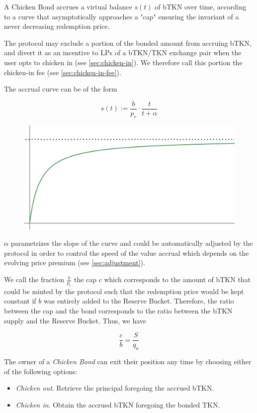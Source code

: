 \documentclass{article}
\begin{document}
A Chicken Bond accrues a virtual balance $s(t)$ of bTKN over time, according to a curve that asymptotically approaches a "cap" ensuring the invariant of a never decreasing redemption price. 

The protocol may exclude a portion of the bonded amount from accruing bTKN, and divert it as an incentive to LPs of a bTKN/TKN exchange pair when the user opts to chicken in (see \ref{sec:chicken-in}). We therefore call this portion the chicken-in fee (see \ref{sec:chicken-in-fee}).

The accrual curve can be of the form 

\begin{equation}
  \label{eq:accrual}
    s(t) := \frac{b}{p_r} \cdot \frac{t}{t+\alpha}
\end{equation}

\begin{figure}
    \centering
    \includegraphics[width=0.5\linewidth]{./ChickenBonds_Whitepaper_accrualcurve.png}
\end{figure}

$\alpha$ parametrizes the slope of the curve and could be automatically adjusted by the protocol in order to control the speed of the value accrual which depends on the evolving price premium (see \ref{sec:adjustment}).

We call the fraction $\frac{b}{p_r}$ the cap $c$ which corresponds to the amount of bTKN that could be minted by the protocol such that the redemption price would be kept constant if $b$ was entirely added to the Reserve Bucket. Therefore, the ratio between the cap and the bond corresponds to the ratio between the bTKN supply and the Reserve Bucket. Thus, we have

\begin{equation}
  \label{eq:cap-bond-ratio}
    \frac{c}{b} = \frac{S}{q_a}
\end{equation}   

The owner of a \textit{Chicken Bond} can exit their position any time by choosing either of the following options:

\begin{itemize}
    \item \textit{Chicken out}. Retrieve the principal foregoing the accrued bTKN.
    \item \textit{Chicken in}. Obtain the accrued bTKN foregoing the bonded TKN.
\end{itemize}
\end{document}
